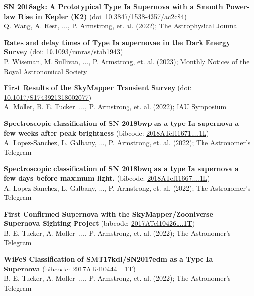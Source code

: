 \documentclass[letterpaper,11pt]{article}
\newcommand*\lbreak{\\[\baselineskip]}
\newcommand{\publicationElement}[5]{%
    \textbf{{#1}} ({#4})\\{#3}; {#2}\lbreak{}
}
\begin{document}
        \publicationElement{SN 2018agk: A Prototypical Type Ia Supernova with a Smooth Power-law Rise in Kepler (K2)}{The Astrophysical Journal}{Q. Wang, A. Rest, ..., P. Armstrong, et. al. (2022)}{doi: \href{https://doi.org/10.3847/1538-4357/ac2c84}{\underline{10.3847/1538-4357/ac2c84}}}{}
        \publicationElement{Rates and delay times of Type Ia supernovae in the Dark Energy Survey}{Monthly Notices of the Royal Astronomical Society}{P. Wiseman, M. Sullivan, ..., P. Armstrong, et. al. (2023)}{doi: \href{https://doi.org/10.1093/mnras/stab1943}{\underline{10.1093/mnras/stab1943}}}{}
        \publicationElement{First Results of the SkyMapper Transient Survey}{IAU Symposium}{A. Möller, B. E. Tucker, ..., P. Armstrong, et. al. (2022)}{doi: \href{https://doi.org/10.1017/S1743921318002077}{\underline{10.1017/S1743921318002077}}}{}
        \publicationElement{Spectroscopic classification of SN 2018bwp as a type Ia supernova a few weeks after peak brightness}{The Astronomer's Telegram}{A. Lopez-Sanchez, L. Galbany, ..., P. Armstrong, et. al. (2022)}{bibcode: \href{https://ui.adsabs.harvard.edu/abs/2018ATel11671....1L/abstract}{\underline{2018ATel11671....1L}}}{}
        \publicationElement{Spectroscopic classification of SN 2018bwq as a type Ia supernova a few days before maximum light.}{The Astronomer's Telegram}{A. Lopez-Sanchez, L. Galbany, ..., P. Armstrong, et. al. (2022)}{bibcode: \href{https://ui.adsabs.harvard.edu/abs/2018ATel11667....1L/abstract}{\underline{2018ATel11667....1L}}}{}
        \publicationElement{First Confirmed Supernova with the SkyMapper/Zooniverse Supernova Sighting Project}{The Astronomer's Telegram}{B. E. Tucker, A. Moller, ..., P. Armstrong, et. al. (2022)}{bibcode: \href{https://ui.adsabs.harvard.edu/abs/2017ATel10426....1T/abstract}{\underline{2017ATel10426....1T}}}{}
        \publicationElement{WiFeS Classification of SMT17kdl/SN2017edm as a Type Ia Supernova}{The Astronomer's Telegram}{B. E. Tucker, A. Moller, ..., P. Armstrong, et. al. (2022)}{bibcode: \href{https://ui.adsabs.harvard.edu/abs/2017ATel10444....1T/abstract}{\underline{2017ATel10444....1T}}}{}
\end{document}
